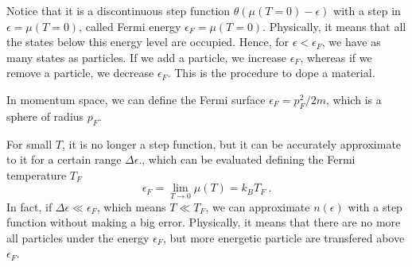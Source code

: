     Notice that it is a discontinuous step function $\theta (\mu(T=0) - \epsilon)$ with a step in $\epsilon = \mu(T = 0)$, called Fermi energy $\epsilon_F = \mu(T=0)$. Physically, it means that all the states below this energy level are occupied. Hence, for $\epsilon < \epsilon_F$, we have as many states as particles. If we add a particle, we increase $\epsilon_F$, whereas if we remove a particle, we decrease $\epsilon_F$. This is the procedure to dope a material.
    
    In momentum space, we can define the Fermi surface $\epsilon_F = p_F^2 / 2m$, which is a sphere of radius $p_F$.

    For small $T$, it is no longer a step function, but it can be accurately approximate to it for a certain range $\Delta \epsilon$., which can be evaluated defining the Fermi temperature $T_F$
    \begin{equation*}
        \epsilon_F = \lim_{T \rightarrow 0} \mu (T) = k_B T_F ~.
    \end{equation*}
    In fact, if $\Delta \epsilon \ll \epsilon_F$, which means $T \ll T_F$, we can approximate $n(\epsilon)$ with a step function without making a big error. Physically, it means that there are no more all particles under the energy $\epsilon_F$, but more energetic particle are transfered above $\epsilon_F$.

